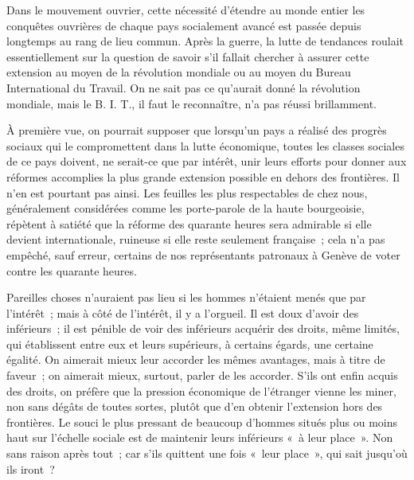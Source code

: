 \documentclass[french,twoside]{book} %
\begin{document}
Dans le mouvement ouvrier, cette nécessité d'étendre au monde entier les conquêtes ouvrières de chaque pays socialement avancé est passée depuis longtemps au rang de lieu commun. Après la guerre, la lutte de tendances roulait essentiellement sur la question de savoir s'il fallait chercher à assurer cette extension au moyen de la révolution mondiale ou au moyen du Bureau International du Travail. On ne sait pas ce qu'aurait donné la révolution mondiale, mais le B. I. T., il faut le reconnaître, n'a pas réussi brillamment.\par
À première vue, on pourrait supposer que lorsqu'un pays a réalisé des progrès sociaux qui le compromettent dans la lutte économique, toutes les classes sociales de ce pays doivent, ne serait-ce que par intérêt, unir leurs efforts pour donner aux réformes accomplies la plus grande extension possible en dehors des frontières. Il n'en est pourtant pas ainsi. Les feuilles les plus respectables de chez nous, généralement considérées comme les porte-parole de la haute bourgeoisie, répètent à satiété que la réforme des quarante heures sera admirable si elle devient internationale, ruineuse si elle reste seulement française ; cela n'a pas empêché, sauf erreur, certains de nos représentants patronaux à Genève de voter contre les quarante heures.\par
Pareilles choses n'auraient pas lieu si les hommes n'étaient menés que par l'intérêt ; mais à côté de l'intérêt, il y a l'orgueil. Il est doux d'avoir des inférieurs ; il est pénible de voir des inférieurs acquérir des droits, même limités, qui établissent entre eux et leurs supérieurs, à certains égards, une certaine égalité. On aimerait mieux leur accorder les mêmes avantages, mais à titre de faveur ; on aimerait mieux, surtout, parler de les accorder. S'ils ont enfin acquis des droits, on préfère que la pression économique de l'étranger vienne les miner, non sans dégâts de toutes sortes, plutôt que d'en obtenir l'extension hors des frontières. Le souci le plus pressant de beaucoup d'hommes situés plus ou moins haut sur l'échelle sociale est de maintenir leurs inférieurs « à leur place ». Non sans raison après tout ; car s'ils quittent une fois « leur place », qui sait jusqu'où ils iront ?\par
\end{document}
